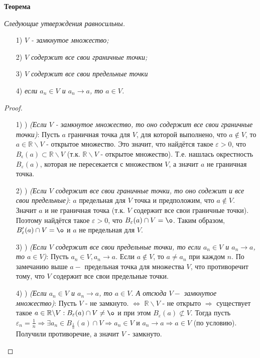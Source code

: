 \documentclass[12pt]{article}
\theoremstyle{definition}
\begin{document}
\textbf{Теорема}

\textit{Следующие утверждения равносильны.}

\begin{itemize}
    \item[1)] \textit{$V$ - замкнутое множество;}
    \item[2)] \textit{$V$ содержит все свои граничные точки;}
    \item[3)] \textit{$V$ содержит все свои предельные точки}
    \item[4)] \textit{если $a_n\in V$ и $a_n\rightarrow a$, то $a\in V$.}
\end{itemize}

\begin{proof}
 
\begin{itemize}
    \item[1) \Rightarrow2)]\textit{(Если $V$ - замкнутое множество, то оно содержит все свои граничные точки)}: \newline Пусть $a$ граничная точка для $V$, для которой выполнено, что $a\not\in V$, то $a\in\mathbb{R}\backslash V$ - открытое множество. Это значит, что найдётся такое $\varepsilon > 0$, что $B_\epsilon(a)\subset \mathbb{R}\backslash V$ (т.к. $\mathbb{R}\backslash V$ - открытое множество). Т.е. нашлась окрестность $B_\varepsilon(a)$, которая не пересекается с множеством $V$, а значит $a$ не граничная точка.
    \item[2) \Rightarrow3)] \textit{(Если $V$ содержит все свои граничные точки, то оно содежит и все свои предельные)}:  $a$ предельная для $V$ точка и предположим, что $a \not\in V$. Значит $a$ и не граничная точка (т.к. $V$ содержит все свои граничные точки). Поэтому найдётся такое $\varepsilon > 0$, что $B_\varepsilon(a)\cap V = \o$. Таким образом, $B'_\varepsilon(a)\cap V=\o$ и $a$ не предельная для $V$.
    \item[3) \Rightarrow4)] \textit{(Если $V$ содержит все свои предельные точки, то если $a_n\in V$ и $a_n\rightarrow a$, то $a\in V$)}: \newline Пусть $a_n\in V, a_n\rightarrow a$. Если $a\not\in V$, то $a\neq a_n$ при каждом $n$. По замечанию выше $a - $ предельная точка для множества $V$, что противоречит тому, что $V$ содержит все свои предельные точки.
    \item[4) \Rightarrow1)] \textit{(Если $a_n\in V$ и $a_n\rightarrow a$, то $a\in V$. А отсюда $V - $ замкнутое множество)}: \newline Пусть $V$ - не замкнуто. $\Leftrightarrow$ $\mathbb{R}\backslash V$ - не открыто $\Rightarrow$ существует такое $a\in \mathbb{R}\backslash V: B_\varepsilon(a) \cap V \neq \o$ и при этом $B_\varepsilon(a)\not\subset V$. Тогда пусть $\varepsilon_n = \frac{1}{n} \Rightarrow \exists a_n\in B_{\frac{1}{n}}(a) \cap V \Rightarrow a_n\in V$ и $a_n\rightarrow a \Rightarrow a\in V$ (по условию). Получили противоречие, а значит $V$ - замкнуто.
\end{itemize}
\end{proof}
\end{document}
